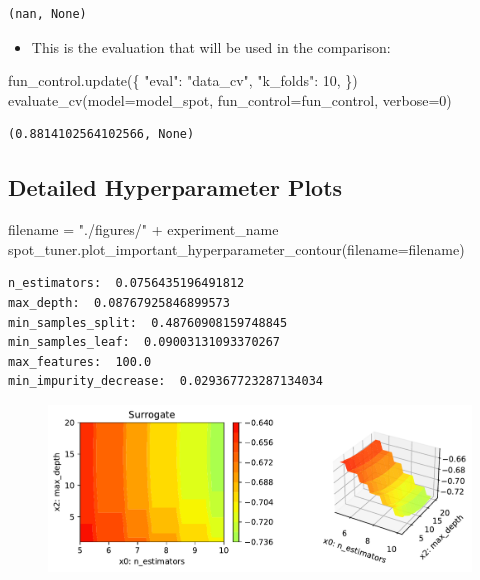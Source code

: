 \documentclass[
  letterpaper,
  DIV=11,
  numbers=noendperiod]{scrreprt}
\newenvironment{Shaded}{\begin{snugshade}}{\end{snugshade}}
\newcommand{\DecValTok}[1]{\textcolor[rgb]{0.68,0.00,0.00}{#1}}
\newcommand{\NormalTok}[1]{\textcolor[rgb]{0.00,0.23,0.31}{#1}}
\newcommand{\OperatorTok}[1]{\textcolor[rgb]{0.37,0.37,0.37}{#1}}
\newcommand{\StringTok}[1]{\textcolor[rgb]{0.13,0.47,0.30}{#1}}
\providecommand{\tightlist}{%
  \setlength{\itemsep}{0pt}\setlength{\parskip}{0pt}}\usepackage{longtable,booktabs,array}
\begin{document}
\begin{verbatim}
(nan, None)
\end{verbatim}

\begin{itemize}
\tightlist
\item
  This is the evaluation that will be used in the comparison:
\end{itemize}

\begin{Shaded}
\begin{Highlighting}[]
\NormalTok{fun\_control.update(\{}
     \StringTok{"eval"}\NormalTok{: }\StringTok{"data\_cv"}\NormalTok{,}
     \StringTok{"k\_folds"}\NormalTok{: }\DecValTok{10}\NormalTok{,}
\NormalTok{\})}
\NormalTok{evaluate\_cv(model}\OperatorTok{=}\NormalTok{model\_spot, fun\_control}\OperatorTok{=}\NormalTok{fun\_control, verbose}\OperatorTok{=}\DecValTok{0}\NormalTok{)}
\end{Highlighting}
\end{Shaded}

\begin{verbatim}
(0.8814102564102566, None)
\end{verbatim}

\hypertarget{detailed-hyperparameter-plots-3}{%
\subsection{Detailed Hyperparameter
Plots}\label{detailed-hyperparameter-plots-3}}

\begin{Shaded}
\begin{Highlighting}[]
\NormalTok{filename }\OperatorTok{=} \StringTok{"./figures/"} \OperatorTok{+}\NormalTok{ experiment\_name}
\NormalTok{spot\_tuner.plot\_important\_hyperparameter\_contour(filename}\OperatorTok{=}\NormalTok{filename)}
\end{Highlighting}
\end{Shaded}

\begin{verbatim}
n_estimators:  0.0756435196491812
max_depth:  0.08767925846899573
min_samples_split:  0.48760908159748845
min_samples_leaf:  0.09003131093370267
max_features:  100.0
min_impurity_decrease:  0.029367723287134034
\end{verbatim}

\begin{figure}[H]

{\centering \includegraphics{16_spot_hpt_sklearn_multiclass_classification_randomforest_files/figure-pdf/cell-48-output-2.pdf}

}

\end{figure}
\end{document}

